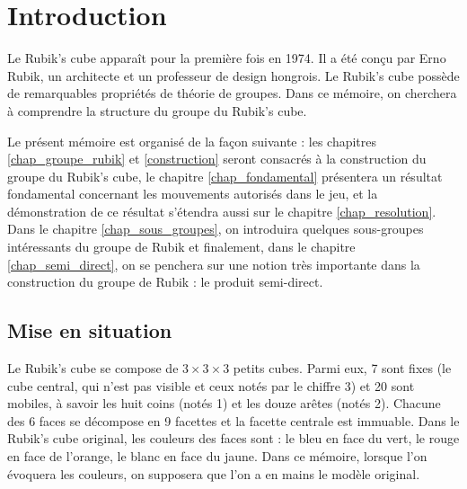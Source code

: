 \documentclass[french]{report}
\begin{document}
\tableofcontents

\newpage

\chapter*{Introduction}

Le Rubik's cube apparaît pour la première fois en 1974. Il a été conçu par Erno Rubik, un architecte et un professeur de design hongrois. Le Rubik's cube possède de remarquables propriétés de théorie de groupes. Dans ce mémoire, on cherchera à comprendre la structure du groupe du Rubik's cube.

Le présent mémoire est organisé de la façon suivante : les chapitres \ref{chap_groupe_rubik} et \ref{construction} seront consacrés à la construction du groupe du Rubik's cube, le chapitre \ref{chap_fondamental} présentera un résultat fondamental concernant les mouvements autorisés dans le jeu, et la démonstration de ce résultat s'étendra aussi sur le chapitre \ref{chap_resolution}. Dans le chapitre \ref{chap_sous_groupes}, on introduira quelques sous-groupes intéressants du groupe de Rubik et finalement, dans le chapitre \ref{chap_semi_direct}, on se penchera sur une notion très importante dans la construction du groupe de Rubik : le produit semi-direct.

\section*{Mise en situation}

Le Rubik's cube se compose de $3 \times 3 \times 3$ petits cubes. Parmi eux, 7 sont fixes (le cube central, qui n'est pas visible et ceux notés par le chiffre 3) et 20 sont mobiles, à savoir les huit coins (notés 1) et les douze arêtes (notés 2). Chacune des 6 faces se décompose en 9 facettes et la facette centrale est immuable. Dans le Rubik's cube original, les couleurs des faces sont : le bleu en face du vert, le rouge en face de l'orange, le blanc en face du jaune. Dans ce mémoire, lorsque l'on évoquera les couleurs, on supposera que l'on a en mains le modèle original.
\end{document}
